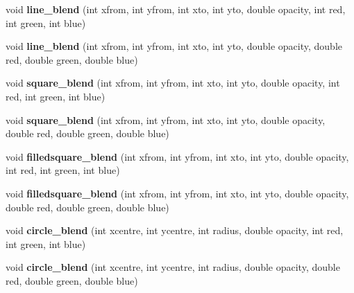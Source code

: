 \begin{DoxyCompactItemize}
\item 
\hypertarget{classpngwriter_ad5a82f5de2f4f11bbeb843801b18f522}{}void {\bfseries line\+\_\+blend} (int xfrom, int yfrom, int xto, int yto, double opacity, int red, int green, int blue)\label{classpngwriter_ad5a82f5de2f4f11bbeb843801b18f522}

\item 
\hypertarget{classpngwriter_a8c3eebc20c8cd8677849e712b56ccfe0}{}void {\bfseries line\+\_\+blend} (int xfrom, int yfrom, int xto, int yto, double opacity, double red, double green, double blue)\label{classpngwriter_a8c3eebc20c8cd8677849e712b56ccfe0}

\item 
\hypertarget{classpngwriter_a8602baf96382f5b3da3ee6bd087be778}{}void {\bfseries square\+\_\+blend} (int xfrom, int yfrom, int xto, int yto, double opacity, int red, int green, int blue)\label{classpngwriter_a8602baf96382f5b3da3ee6bd087be778}

\item 
\hypertarget{classpngwriter_a1510beed59853dd0998f81aed71d35a1}{}void {\bfseries square\+\_\+blend} (int xfrom, int yfrom, int xto, int yto, double opacity, double red, double green, double blue)\label{classpngwriter_a1510beed59853dd0998f81aed71d35a1}

\item 
\hypertarget{classpngwriter_a114eb552a791cda3c397e0505b59be8e}{}void {\bfseries filledsquare\+\_\+blend} (int xfrom, int yfrom, int xto, int yto, double opacity, int red, int green, int blue)\label{classpngwriter_a114eb552a791cda3c397e0505b59be8e}

\item 
\hypertarget{classpngwriter_a1a42160271887b2519c30486e1ff458c}{}void {\bfseries filledsquare\+\_\+blend} (int xfrom, int yfrom, int xto, int yto, double opacity, double red, double green, double blue)\label{classpngwriter_a1a42160271887b2519c30486e1ff458c}

\item 
\hypertarget{classpngwriter_af6b6051c6fe888baf3028bc07ef191b1}{}void {\bfseries circle\+\_\+blend} (int xcentre, int ycentre, int radius, double opacity, int red, int green, int blue)\label{classpngwriter_af6b6051c6fe888baf3028bc07ef191b1}

\item 
\hypertarget{classpngwriter_a05c6fcda5e65d0d927ca83f4957ee994}{}void {\bfseries circle\+\_\+blend} (int xcentre, int ycentre, int radius, double opacity, double red, double green, double blue)\label{classpngwriter_a05c6fcda5e65d0d927ca83f4957ee994}


\end{DoxyCompactItemize}
